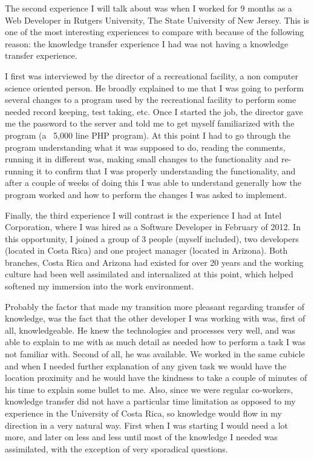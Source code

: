 \documentclass[12pt, letterpaper]{article}
\begin{document}
The second experience I will talk about was when I worked for 9 months as a Web Developer in Rutgers University, The
State University of New Jersey. This is one of the most interesting experiences to compare with because of the following 
reason: the knowledge transfer experience I had was not having a knowledge transfer experience.

I first was interviewed by the director of a recreational facility, a non computer science oriented person. He broadly 
explained to me that I was going to 
perform several changes to a program used by the recreational facility to perform some needed record keeping,
test taking, etc. Once I started the job, the director gave me the password to the server and told me to 
get myself familiarized with the program (a ~5,000 line PHP program). At this point I had to go through
the program understanding what it was supposed to do, reading the comments, running it in different was, making small 
changes to the 
functionality and re-running it to confirm that I was properly understanding the functionality, and after a couple of 
weeks of doing this I was able to understand generally how the program worked and how to perform the changes I was asked
to implement.

Finally, the third experience I will contrast is the experience I had at Intel Corporation, where I was hired
as a Software Developer in February of 2012. In this opportunity, I joined a group of 3 people (myself included),
two developers (located in Costa Rica) and one project manager (located in Arizona). Both branches, Costa Rica 
and Arizona had existed for over 20 years and the working culture had been well assimilated and internalized
at this point, which helped softened my immersion into the work environment.

Probably the factor that made my transition more pleasant regarding transfer of knowledge, was the fact that 
the other developer I was working with was, first of all, knowledgeable. He knew the technologies and processes
very well, and was able to explain to me with as much detail as needed how to perform a task I was not familiar with. 
Second of all, he was available. We worked in the same cubicle and when I needed further explanation of any given 
task we would have the location proximity and he would have the kindness to take a couple of minutes of his time
to explain some bullet to me. Also, since we were regular co-workers, knowledge transfer did not have a particular
time limitation as opposed to my experience in the University of Costa Rica, so knowledge would flow in my
direction in a very natural way. First when I was starting I would need a lot more, and later on less and less 
until most of the knowledge I needed was assimilated, with the exception of very sporadical questions. 
\end{document}
